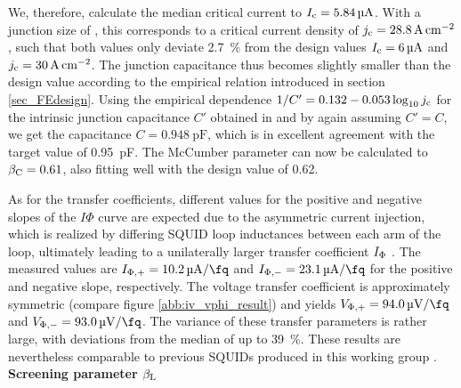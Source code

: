 
We, therefore, calculate the median critical current to $I_{\rm c}=\qty{5.84}{\micro\ampere}$. With a junction size of , this corresponds to a critical current density of $j_{\rm c}=\qty{28.8}{\ampere\per\centi\meter\squared}$, such that both values only deviate \qty{2.7}{\percent} from the design values $I_{\rm c}=\qty{6}{\micro\ampere}$ and $j_{\rm c}=\qty{30}{\ampere\per\centi\meter\squared}$. The junction capacitance thus becomes slightly smaller than the design value according to the empirical relation introduced in section \ref{sec_FEdesign}. Using the empirical dependence $1/C'=0.132-0.053\log_{10}j_{\rm c}$ for the intrinsic junction capacitance $C'$ obtained in \cite{Bauer2022} and by again assuming $C'=C$, we get the capacitance $C=\qty{0.948}{\pico\farad}$, which is in excellent agreement with the target value of \qty{0.95}{\pico\farad}. The McCumber parameter can now be calculated to $\beta_{\rm C}=0.61$, also fitting well with the design value of 0.62. 

As for the transfer coefficients, different values for the positive and negative slopes of the $I\Phi$ curve are expected due to the asymmetric current injection, which is realized by differing SQUID loop inductances between each arm of the loop, ultimately leading to a unilaterally larger transfer coefficient $I_{\rm \Phi}$ \cite{Ferring2015}. The measured values are $I_{\rm \Phi,+}=\qty{10.2}{\micro\ampere\per\fq}$ and $I_{\rm \Phi,-}=\qty{23.1}{\micro\ampere\per\fq}$ for the positive and negative slope, respectively. The voltage transfer coefficient is approximately symmetric (compare figure \ref{abb:iv_vphi_result}) and yields $V_{\rm \Phi,+}=\qty{94.0}{\micro\volt\per\fq}$ and $V_{\rm \Phi,-}=\qty{93.0}{\micro\volt\per\fq}$. The variance of these transfer parameters is rather large, with deviations from the median of up to \qty{39}{\percent}. These results are nevertheless comparable to previous SQUIDs produced in this working group \cite{Richter2017}. \\  

{\large{\textbf{Screening parameter $\beta_{\rm L}$}}}
\\

